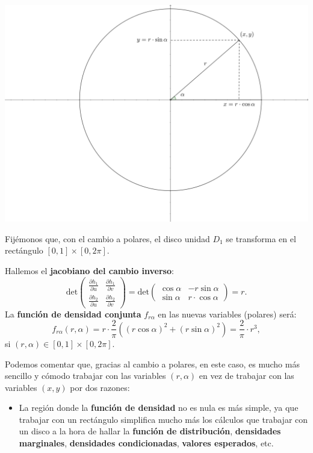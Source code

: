 \documentclass[]{book}
\providecommand{\tightlist}{%
  \setlength{\itemsep}{0pt}\setlength{\parskip}{0pt}}
\begin{document}
\includegraphics{Images/Polares.png}

Fijémonos que, con el cambio a polares, el disco unidad \(D_1\) se transforma en el rectángulo \([0,1]\times [0,2\pi]\).

Hallemos el \textbf{jacobiano del cambio inverso}:
\[
\mathrm{det}\begin{pmatrix}\frac{\partial h_1}{\partial u} & \frac{\partial h_1}{\partial v}\\ \frac{\partial h_2}{\partial u} & \frac{\partial h_2}{\partial v}\end{pmatrix} =\mathrm{det}\begin{pmatrix}\cos\alpha & -r\sin\alpha\\ \sin\alpha & r\cdot\cos\alpha\end{pmatrix} = r.
\]
La \textbf{función de densidad conjunta} \(f_{r\alpha}\) en las nuevas variables (polares) será:
\[
f_{r\alpha}(r,\alpha)=r\cdot \frac{2}{\pi}\left((r\cos\alpha)^2+(r\sin\alpha)^2\right)=\frac{2}{\pi}\cdot r^3,
\]
si \((r,\alpha)\in [0,1]\times [0,2\pi]\).

Podemos comentar que, gracias al cambio a polares, en este caso, es mucho más sencillo y cómodo trabajar con las variables \((r,\alpha)\) en vez de trabajar con las variables \((x,y)\) por dos razones:

\begin{itemize}
\tightlist
\item
  La región donde la \textbf{función de densidad} no es nula es más simple, ya que trabajar con un rectángulo simplifica mucho más los cálculos que trabajar con un disco a la hora de hallar la \textbf{función de distribución}, \textbf{densidades marginales}, \textbf{densidades condicionadas}, \textbf{valores esperados}, etc.
\end{itemize}
\end{document}
